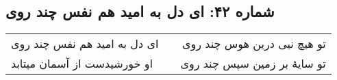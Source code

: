\begin{center}
\section*{شماره ۴۲: ای دل به امید هم نفس چند روی}
\label{sec:042}
\begin{longtable}{l p{0.5cm} r}
ای دل به امید هم نفس چند روی
&&
تو هیچ نیی درین هوس چند روی
\\
او خورشیدست از آسمان میتابد
&&
تو سایهٔ بر زمین سپس چند روی
\\
\end{longtable}
\end{center}
